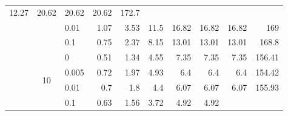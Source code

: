 \begin{table}[htbp]
\begin{tabular}{|c|clrrrrrrr|}
      \cellcolor[rgb]{ .647,  .827,  .537}12.27 &
      \cellcolor[rgb]{ .388,  .745,  .482}20.62 &
      \cellcolor[rgb]{ .388,  .745,  .482}20.62 &
      \cellcolor[rgb]{ .388,  .745,  .482}20.62 &
      \cellcolor[rgb]{ .608,  .761,  .902}172.7
      \\
     &
       &
      0.01 &
      \cellcolor[rgb]{ .992,  .937,  .612}1.07 &
      \cellcolor[rgb]{ .918,  .914,  .596}3.53 &
      \cellcolor[rgb]{ .671,  .835,  .545}11.5 &
      \cellcolor[rgb]{ .506,  .784,  .51}16.82 &
      \cellcolor[rgb]{ .506,  .784,  .51}16.82 &
      \cellcolor[rgb]{ .506,  .784,  .51}16.82 &
      \cellcolor[rgb]{ .98,  .988,  .996}169
      \\
     &
       &
      0.1 &
      \cellcolor[rgb]{ 1,  .937,  .612}0.75 &
      \cellcolor[rgb]{ .953,  .925,  .604}2.37 &
      \cellcolor[rgb]{ .773,  .867,  .565}8.15 &
      \cellcolor[rgb]{ .624,  .82,  .533}13.01 &
      \cellcolor[rgb]{ .624,  .82,  .533}13.01 &
      \cellcolor[rgb]{ .624,  .82,  .533}13.01 &
      168.8
      \\
\cmidrule{2-10}     &
      \multirow{4}[2]{*}{10} &
      0 &
      \cellcolor[rgb]{ 1,  .937,  .612}0.51 &
      \cellcolor[rgb]{ .929,  .918,  .596}1.34 &
      \cellcolor[rgb]{ .639,  .827,  .537}4.55 &
      \cellcolor[rgb]{ .388,  .745,  .482}7.35 &
      \cellcolor[rgb]{ .388,  .745,  .482}7.35 &
      \cellcolor[rgb]{ .388,  .745,  .482}7.35 &
      \cellcolor[rgb]{ .608,  .761,  .902}156.41
      \\
     &
       &
      0.005 &
      \cellcolor[rgb]{ .984,  .933,  .608}0.72 &
      \cellcolor[rgb]{ .871,  .898,  .584}1.97 &
      \cellcolor[rgb]{ .608,  .816,  .529}4.93 &
      \cellcolor[rgb]{ .475,  .773,  .502}6.4 &
      \cellcolor[rgb]{ .475,  .773,  .502}6.4 &
      \cellcolor[rgb]{ .475,  .773,  .502}6.4 &
      154.42
      \\
     &
       &
      0.01 &
      \cellcolor[rgb]{ .984,  .933,  .612}0.7 &
      \cellcolor[rgb]{ .886,  .902,  .588}1.8 &
      \cellcolor[rgb]{ .655,  .831,  .541}4.4 &
      \cellcolor[rgb]{ .506,  .784,  .51}6.07 &
      \cellcolor[rgb]{ .506,  .784,  .51}6.07 &
      \cellcolor[rgb]{ .506,  .784,  .51}6.07 &
      \cellcolor[rgb]{ .706,  .82,  .929}155.93
      \\
     &
       &
      0.1 &
      \cellcolor[rgb]{ .992,  .937,  .612}0.63 &
      \cellcolor[rgb]{ .91,  .91,  .592}1.56 &
      \cellcolor[rgb]{ .714,  .851,  .553}3.72 &
      \cellcolor[rgb]{ .608,  .816,  .529}4.92 &
      \cellcolor[rgb]{ .608,  .816,  .529}4.92 &

\end{tabular}
\end{table}
